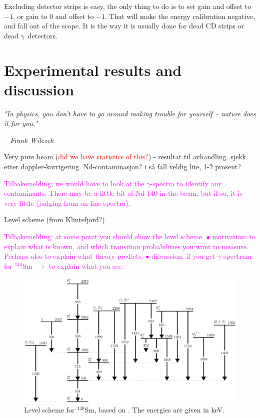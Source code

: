 \documentclass[twoside,english]{uiofysmaster/uiofysmaster}
\newcommand{\Sm}{$^{140}$Sm} %
\newcommand{\ga}{$\gamma$}
\begin{document}
Excluding detector strips is easy, the only thing to do is to set gain and offset to $-1$, or gain to $0$ and offset to $-1$. 
That will make the energy calibration negative, and fall out of the scope. 
It is the way it is usually done for dead CD strips or dead \ga\ detectors. 




\chapter{Experimental results and discussion}
\epigraph{\textit{"In physics, you don't have to go around making trouble for yourself – nature does it for you."}}{\textit{– Frank Wilczek}}


Very pure beam (\textcolor{red}{did we have statistics of this?}) - resultat til avhandling. sjekk etter doppler-korrigering. Nd-contaminasjon? i så fall veldig lite, 1-2 prosent?

\textcolor{Magenta}{Tilbakemelding: \newline
we would have to look at the \ga-spectra to identify any contaminants. There may be a little bit of Nd-140 in the beam, but if so, it is very little (judging from on-line spectra).}


\bigskip


Level scheme (from Klintefjord?)\newline

\textcolor{Magenta}{Tilbakemelding: \newline
at some point you should show the level scheme. \newline
$\bullet$ motivation: to explain what is known, and which transition probabilities you want to measure.  \newline
Perhaps also to explain what theory predicts. \newline
$\bullet$ discussion: if you get \ga-spectrum for \Sm\ $\rightarrow$ to explain what you see.}


\begin{figure}[ht]
	\centering
	\includegraphics[width=\textwidth]{Images/Level-scheme-140Sm-v2.png}
	\caption{Level scheme for \Sm, based on \cite{Klintefjord, NNDC-levels}. The energies are given in keV.}
	\label{fig:levels}
\end{figure}
\end{document}
